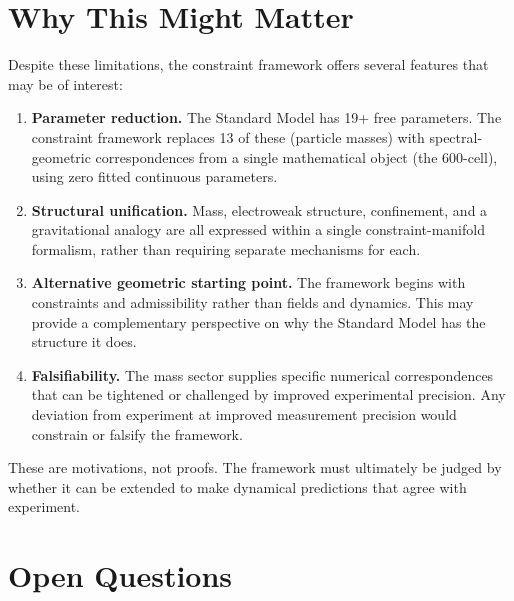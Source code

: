 \documentclass[12pt]{article}
\begin{document}
\section{Why This Might Matter}\label{sec:motivation}

Despite these limitations, the constraint framework offers several features that may be of interest:

\begin{enumerate}
    \item \textbf{Parameter reduction.} The Standard Model has 19+ free parameters. The constraint framework replaces 13 of these (particle masses) with spectral-geometric correspondences from a single mathematical object (the 600-cell), using zero fitted continuous parameters.

    \item \textbf{Structural unification.} Mass, electroweak structure, confinement, and a gravitational analogy are all expressed within a single constraint-manifold formalism, rather than requiring separate mechanisms for each.

    \item \textbf{Alternative geometric starting point.} The framework begins with constraints and admissibility rather than fields and dynamics. This may provide a complementary perspective on why the Standard Model has the structure it does.

    \item \textbf{Falsifiability.} The mass sector supplies specific numerical correspondences that can be tightened or challenged by improved experimental precision. Any deviation from experiment at improved measurement precision would constrain or falsify the framework.
\end{enumerate}

These are motivations, not proofs. The framework must ultimately be judged by whether it can be extended to make dynamical predictions that agree with experiment.

\section{Open Questions}\label{sec:open}
\end{document}
